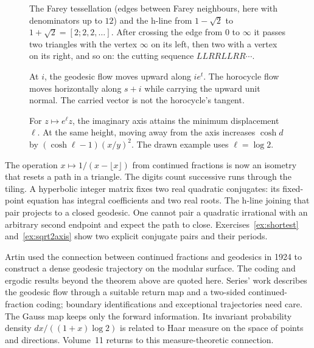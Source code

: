\begin{figure}[ht]
\centering
{}
\caption{The Farey tessellation (edges between Farey neighbours, here with denominators up to $12$) and the h-line from $1-\sqrt2$ to $1+\sqrt2=[2;2,2,\dots]$. After crossing the edge from $0$ to $\infty$ it
passes two triangles with the vertex $\infty$ on its left, then two with a vertex on its right, and so on: the cutting sequence $LLRRLLRR\cdots$.}
\label{fig:farey}
\end{figure}

\begin{figure}[ht]
\centering{}
\caption{At $i$, the geodesic flow moves upward along $ie^t$. The horocycle flow moves horizontally along $s+i$ while carrying the upward unit normal. The carried vector is not the horocycle's tangent.}
\label{fig:v9-ch09-geodesic-horocycle}
\end{figure}

\begin{figure}[ht]
\centering{}
\caption{For $z\mapsto e^\ell z$, the imaginary axis attains the minimum displacement $\ell$. At the same height, moving away from the axis increases $\cosh d$ by $(\cosh\ell-1)(x/y)^2$. The drawn example uses $\ell=\log2$.}
\label{fig:v9-ch09-axis-displacement}
\end{figure}

\begin{beauty}
The operation $x\mapsto1/(x-\lfloor x\rfloor)$ from continued fractions is now an isometry that resets a path in a triangle. The digits count successive runs through the tiling. A hyperbolic integer matrix fixes two real quadratic conjugates: its fixed-point equation has integral coefficients and two real roots. The h-line joining that pair projects to a closed geodesic. One cannot pair a quadratic irrational with an arbitrary second endpoint and expect the path to close. Exercises~\ref{ex:shortest} and~\ref{ex:sqrt2axis} show two explicit conjugate pairs and their periods.
\end{beauty}

\begin{remark}
Artin used the connection between continued fractions and geodesics in 1924 to construct a dense geodesic trajectory on the modular surface. The coding and ergodic results beyond the theorem above are quoted here. Series' work describes the geodesic flow through a suitable return map and a two-sided continued-fraction coding; boundary identifications and exceptional trajectories need care. The Gauss map keeps only the forward information. Its invariant probability density $dx/((1+x)\log2)$ is related to Haar measure on the space of points and directions. Volume~11 returns to this measure-theoretic connection.
\end{remark}

